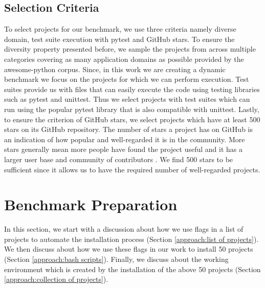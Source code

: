 \subsection{Selection Criteria}
\label{approach:selection criteria}
To select projects for our benchmark, we use three criteria namely diverse domain, test suite execution with pytest and GitHub stars.
To ensure the diversity property presented before, we sample the projects from across multiple categories covering as many application domains as possible provided by the awesome-python corpus.
Since, in this work we are creating a dynamic benchmark we focus on the projects for which we can perform execution.
Test suites provide us with files that can easily execute the code using testing libraries such as pytest and unittest.
Thus we select projects with test suites which can run using the popular pytest library that is also compatible with unittest. 
Lastly, to ensure the criterion of GitHub stars, we select projects which have at least 500 stars on its GitHub repository. 
The number of stars a project has on GitHub is an indication of how popular and well-regarded it is in the community.
More stars generally mean more people have found the project useful and it has a larger user base and community of contributors \cite{github_stars}.
We find 500 stars to be sufficient since it allows us to have the required number of well-regarded projects.  

\section{Benchmark Preparation}
\label{approach:benchmark preparation}
In this section, we start with a discussion about how we use flags in a list of projects to automate the installation process (Section \ref{approach:list of projects}).
We then discuss about how we use these flags in our work to install 50 projects (Section \ref{approach:bash scripts}).
Finally, we discuss about the working environment which is created by the installation of the above 50 projects (Section \ref{approach:collection of projects}).
